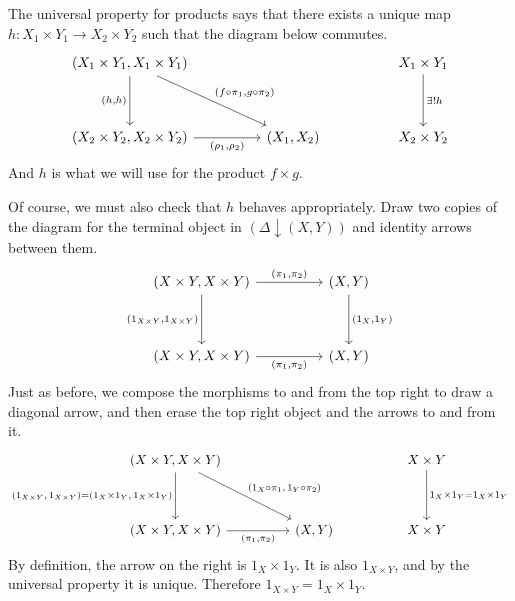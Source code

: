 \documentclass[a4paper,10pt]{scrreprt}
\theoremstyle{definition}
\theoremstyle{plain}
\theoremstyle{remark}
\begin{document}
The universal property for products says that there exists a unique map $h\colon X_{1}\times Y_{1} \to X_{2}\times Y_{2}$ such that the diagram below commutes.
\begin{equation*}
  \begin{tikzcd}[row sep=huge, column sep=huge]
    (X_{1} \times Y_{1}, X_{1} \times Y_{1}) \arrow[d, swap, "{(h, h)}"] \arrow[rd, "{(f \circ \pi_{1}, g \circ \pi_{2})}"] & & X_{1}\times Y_{1} \arrow[d, "\exists!h"]\\
    (X_{2}\times Y_{2}, X_{2}\times Y_{2}) \arrow[r, swap, "{(\rho_{1}, \rho_{2})}"] &  (X_{1}, X_{2})& X_{2}\times Y_{2}
  \end{tikzcd}
\end{equation*}
And $h$ is what we will use for the product $f \times g$.

Of course, we must also check that $h$ behaves appropriately. Draw two copies of the diagram for the terminal object in $(\Delta\downarrow (X,Y))$ and identity arrows between them.
\begin{equation*}
  \begin{tikzcd}[row sep=huge, column sep=huge]
    {(X\times Y, X \times Y)} \arrow[r, "{(\pi_{1}, \pi_{2})}"] \arrow[d, swap, "{(1_{X \times Y}, 1_{X \times Y})}"] & (X, Y) \arrow[d, "{(1_{X}, 1_{Y})}"] \\
    {(X\times Y, X \times Y)} \arrow[r, swap, "{(\pi_{1}, \pi_{2})}"] & (X, Y)
  \end{tikzcd}
\end{equation*}
Just as before, we compose the morphisms to and from the top right to draw a diagonal arrow, and then erase the top right object and the arrows to and from it.
\begin{equation*}
  \begin{tikzcd}[row sep=huge, column sep=huge]
    {(X\times Y, X \times Y)}  \arrow[d, swap, "{(1_{X \times Y},\, 1_{X \times Y}) = (1_{X}\times 1_{Y},\, 1_{X}\times 1_{Y})}"] \arrow[dr, "{(1_{X} \circ \pi_{1},\, 1_{Y} \circ \pi_{2})}"] & & X\times Y \arrow[d, "1_{X}\times1_{Y} = 1_{X}\times1_{Y}"] \\
    {(X\times Y, X \times Y)} \arrow[r, swap, "{(\pi_{1}, \pi_{2})}"] & (X, Y) & X\times Y
  \end{tikzcd}
\end{equation*}
By definition, the arrow on the right is $1_{X}\times1_{Y}$. It is also $1_{X\times Y}$, and by the universal property it is unique. Therefore $1_{X\times Y} = 1_{X}\times 1_{Y}$.
\end{document}
